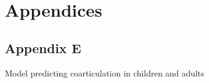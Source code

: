 \documentclass[
]{article}
\begin{document}
\hypertarget{appendices}{%
\section{Appendices}\label{appendices}}

\hypertarget{appendix-e}{%
\subsection{Appendix E}\label{appendix-e}}

\begin{table}[tbp]

\begin{center}
\begin{threeparttable}

\caption{\label{tab:adult-child model sum}Model predicting coarticulation in children 
 and adults}


\end{threeparttable}
\end{center}
\end{table}
\end{document}
